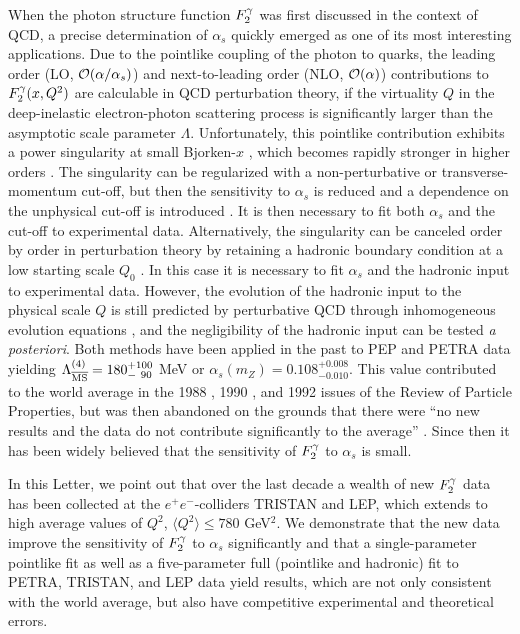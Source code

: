 \documentclass[aps,prl,twocolumn,groupedaddress]{revtex4}
\begin{document}
When the photon structure function $\f2y$ was first discussed in the context of
QCD, a precise determination of $\alpha_s$ quickly emerged as one of its most
interesting applications. Due to the pointlike coupling of the photon to
quarks, the leading order (LO, ${\cal O}(\alpha/\alpha_s)$) \cite{Witten:1977ju} and
next-to-leading order (NLO, ${\cal O}(\alpha)$) \cite{Bardeen:1979hg} contributions
to
$\f2y(x,Q^2)$ are calculable in QCD perturbation theory, if the virtuality $Q$
in the deep-inelastic electron-photon scattering process is significantly
larger than the asymptotic scale parameter $\Lambda$. Unfortunately, this
pointlike contribution exhibits a power singularity at small
Bjorken-$x$ \cite{Duke:1980ij}, which becomes rapidly stronger in higher orders
\cite{Rossi:1983bp}. The singularity can be regularized with a non-perturbative
\cite{Antoniadis:1983fv} or transverse-momentum \cite{Field:1986gf} cut-off,
but then the sensitivity to $\alpha_s$ is reduced and a dependence on the
unphysical cut-off is introduced \cite{Frazer:1987sb}. It is then necessary to
fit both $\alpha_s$ and the cut-off to experimental data. Alternatively, the
singularity can be canceled order by order in perturbation theory by retaining
a hadronic boundary condition at a low starting scale $Q_0$
\cite{Gluck:1983mm}.%
In this case it is necessary to fit $\alpha_s$ and the hadronic
input to experimental data. However, the evolution of the hadronic input to the
physical scale $Q$ is still predicted by perturbative QCD through inhomogeneous
evolution equations \cite{DeWitt:1979wn}, and the negligibility of the hadronic
input can be tested {\em a posteriori}. Both methods have been applied in the
past to PEP and PETRA data yielding $\Lambda^{(4)}_{\overline{\rm MS}}=
180^{+100}_{-~90}$ MeV \cite{Wagner:1986dj} or $\alpha_s(m_Z)=0.108
^{+0.008}_{-0.010}$. This value contributed to the world average in the 1988
\cite{Yost:1988ke}, 1990 \cite{Hernandez:1990yc}, and 1992 \cite{Hikasa:1992je}
issues of the Review of Particle Properties, but was then abandoned on the
grounds that there were ``no new results and the data do not contribute
significantly to the average'' \cite{Montanet:1994xu}. Since then it has been
widely believed \cite{Gluck:1992jc,Aurenche:1994in,Schuler:1995fk,
Gordon:1997pm,Gluck:1999ub} that the sensitivity of $\f2y$ to $\alpha_s$ is
small.

In this Letter, we point out that over the last decade a wealth of new
$\f2y$ data has been collected at the $e^+e^-$-colliders TRISTAN and LEP, which
extends to high average values of $Q^2$, $\langle Q^2\rangle\leq 780$
GeV$^2$. We demonstrate that the new data improve the sensitivity of
$\f2y$ to $\alpha_s$ significantly and that a single-parameter pointlike fit
as well as a five-parameter full (pointlike and hadronic) fit to PETRA,
TRISTAN, and LEP data yield results, which are not only consistent with the
world average, but also have competitive experimental and theoretical errors.
\end{document}
